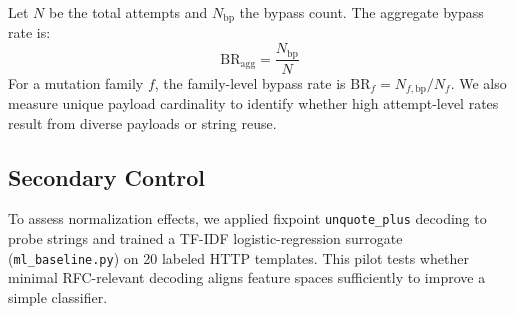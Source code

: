 Let $N$ be the total attempts and $N_{\mathrm{bp}}$ the bypass count. The aggregate bypass rate is:
\begin{equation}
\label{eq:aggregate-bypass-rate}
\mathrm{BR}_{\mathrm{agg}} = \frac{N_{\mathrm{bp}}}{N}
\end{equation}
For a mutation family $f$, the family-level bypass rate is $\mathrm{BR}_f = N_{f,\mathrm{bp}}/N_f$. We also measure unique payload cardinality to identify whether high attempt-level rates result from diverse payloads or string reuse.

\subsection{Secondary Control}
To assess normalization effects, we applied fixpoint \texttt{unquote\_plus} decoding to probe strings and trained a TF-IDF logistic-regression surrogate (\texttt{ml\_baseline.py}) on 20 labeled HTTP templates. This pilot tests whether minimal RFC-relevant decoding aligns feature spaces sufficiently to improve a simple classifier.
